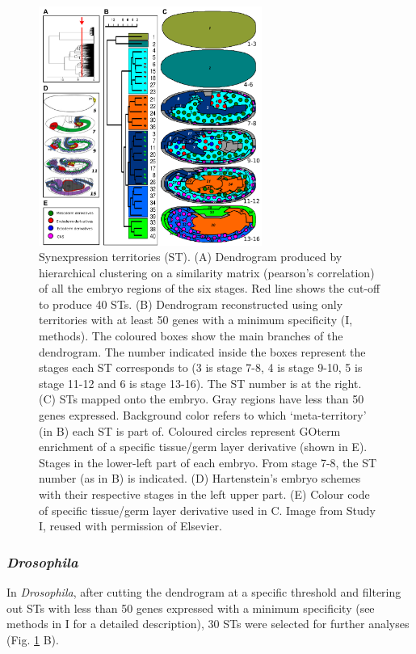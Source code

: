 \begin{figure}[!t]
  \includegraphics[width=0.65\textwidth]{./Images/Art-I/territories.png}
  \centering
  \caption{Synexpression territories (ST). (A) Dendrogram produced by hierarchical clustering on a similarity matrix (pearson's correlation) of all the embryo regions of the six stages. Red line shows the cut-off to produce 40 STs. (B) Dendrogram reconstructed using only territories with at least 50 genes with a minimum specificity (I, methods). The coloured boxes show the main branches of the dendrogram. The number indicated inside the boxes represent the stages each ST corresponds to (3 is stage 7-8, 4 is stage 9-10, 5 is stage 11-12 and 6 is stage 13-16). The ST number is at the right. (C) STs mapped onto the embryo. Gray regions have less than 50 genes expressed. Background color refers to which `meta-territory' (in B) each ST is part of. Coloured circles represent GOterm enrichment of a specific tissue/germ layer derivative (shown in E). Stages in the lower-left part of each embryo. From stage 7-8, the ST number (as in B) is indicated. (D) Hartenstein's embryo schemes \citep{Hartenstein1993} with their respective stages in the left upper part. (E) Colour code of specific tissue/germ layer derivative used in C. Image from Study I, reused with permission of Elsevier.}
  \label{fig:Art-I-territories}
\end{figure}
\subsubsection{\textit{Drosophila}}
In \textit{Drosophila}, after cutting the dendrogram at a specific threshold and filtering out STs with less than 50 genes expressed with a minimum specificity (see methods in I for a detailed description), 30 STs were selected for further analyses (Fig. \ref{fig:Art-I-territories} B).

